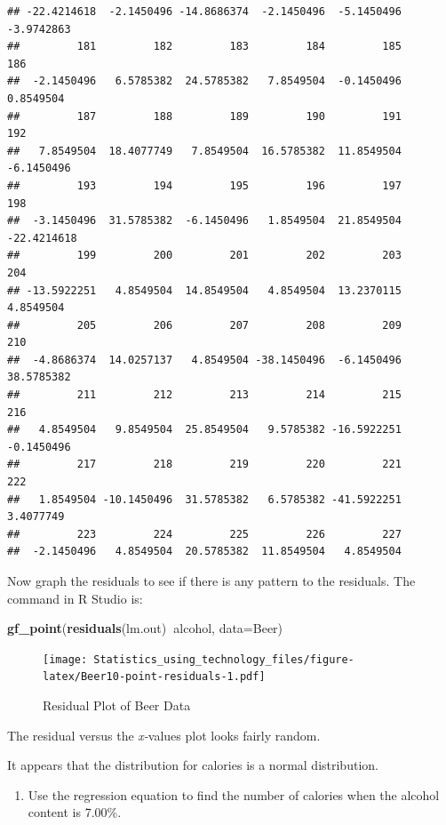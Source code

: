 \documentclass[
]{book}
\newenvironment{Shaded}{\begin{snugshade}}{\end{snugshade}}
\newcommand{\DataTypeTok}[1]{\textcolor[rgb]{0.13,0.29,0.53}{#1}}
\newcommand{\KeywordTok}[1]{\textcolor[rgb]{0.13,0.29,0.53}{\textbf{#1}}}
\newcommand{\NormalTok}[1]{#1}
\newcommand{\OperatorTok}[1]{\textcolor[rgb]{0.81,0.36,0.00}{\textbf{#1}}}
\providecommand{\tightlist}{%
  \setlength{\itemsep}{0pt}\setlength{\parskip}{0pt}}
\begin{document}
\begin{verbatim}
## -22.4214618  -2.1450496 -14.8686374  -2.1450496  -5.1450496  -3.9742863 
##         181         182         183         184         185         186 
##  -2.1450496   6.5785382  24.5785382   7.8549504  -0.1450496   0.8549504 
##         187         188         189         190         191         192 
##   7.8549504  18.4077749   7.8549504  16.5785382  11.8549504  -6.1450496 
##         193         194         195         196         197         198 
##  -3.1450496  31.5785382  -6.1450496   1.8549504  21.8549504 -22.4214618 
##         199         200         201         202         203         204 
## -13.5922251   4.8549504  14.8549504   4.8549504  13.2370115   4.8549504 
##         205         206         207         208         209         210 
##  -4.8686374  14.0257137   4.8549504 -38.1450496  -6.1450496  38.5785382 
##         211         212         213         214         215         216 
##   4.8549504   9.8549504  25.8549504   9.5785382 -16.5922251  -0.1450496 
##         217         218         219         220         221         222 
##   1.8549504 -10.1450496  31.5785382   6.5785382 -41.5922251   3.4077749 
##         223         224         225         226         227 
##  -2.1450496   4.8549504  20.5785382  11.8549504   4.8549504
\end{verbatim}

Now graph the residuals to see if there is any pattern to the residuals. The command in R Studio is:



\begin{Shaded}
\begin{Highlighting}[]
\KeywordTok{gf_point}\NormalTok{(}\KeywordTok{residuals}\NormalTok{(lm.out)}\OperatorTok{~}\NormalTok{alcohol, }\DataTypeTok{data=}\NormalTok{Beer)}
\end{Highlighting}
\end{Shaded}

\begin{figure}
\centering
\texttt{[image: Statistics\_using\_technology\_files/figure-latex/Beer10-point-residuals-1.pdf]}
\caption{\label{fig:Beer10-point-residuals}Residual Plot of Beer Data}
\end{figure}

The residual versus the \emph{x-}values plot looks fairly random.

It appears that the distribution for calories is a normal distribution.

\begin{enumerate}
\def\labelenumi{\alph{enumi}.}
\setcounter{enumi}{1}
\tightlist
\item
  Use the regression equation to find the number of calories when the alcohol content is 7.00\%.
\end{enumerate}
\end{document}
